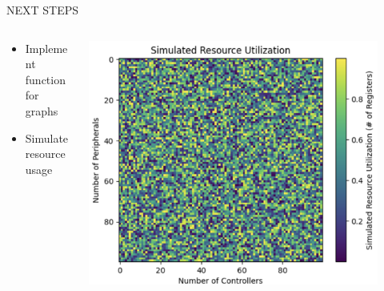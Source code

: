 \begin{frame}{NEXT STEPS}
    \begin{columns}
        \begin{column}{0.5\textwidth}
            \begin{itemize}
                \item Implement function for graphs
                \item Simulate resource usage
            \end{itemize}
        \end{column}
        \begin{column}{0.5\textwidth}
            \centering
            \includegraphics[height=0.8\textheight,width=0.9\textwidth,keepaspectratio]{simulation.png}
        \end{column}
    \end{columns}
\end{frame}